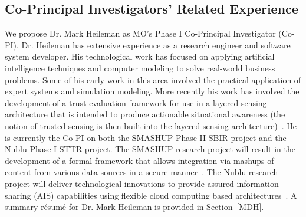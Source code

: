 \documentclass{sbir}
\begin{document}

\subsection{Co-Principal Investigators' Related Experience}
We propose Dr. Mark Heileman as MO's Phase I Co-Principal Investigator (Co-PI). Dr. Heileman has extensive experience as a research engineer and software system developer. His technological work has focused on applying artificial intelligence techniques and computer modeling to solve real-world business problems. Some of his early work in this area involved the practical application of expert systems and simulation modeling. More recently his work has involved the development of a trust evaluation framework for use in a layered sensing architecture that is intended to produce actionable situational awareness (the notion of trusted sensing is then built into the layered sensing architecture)~\cite{HeHeFiSt:09,HeHeHw:09}. He is currently the Co-PI on both the SMASHUP Phase II SBIR project and the Nublu Phase I STTR project. The SMASHUP research project will result in the development of a formal framework that allows integration via mashups of content from various data sources in a secure manner~\cite{HeHeGiEv:10,HeHeShGiJa:11}. The Nublu research project will deliver technological innovations to provide assured information sharing (AIS) capabilities using flexible cloud computing based architectures~\cite{HeHeNaLa:12}. A summary r\'esum\'e for Dr. Mark Heileman is provided in Section~\ref{MDH}.
\end{document}
